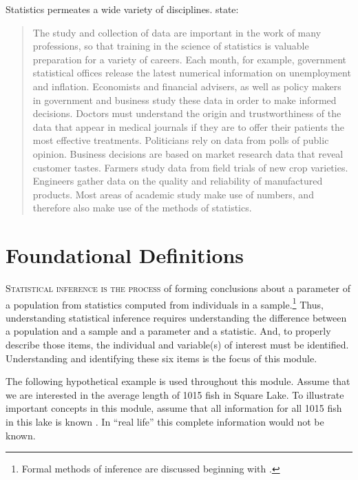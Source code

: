 \documentclass[10pt,openany]{book}\usepackage[]{graphicx}\usepackage[]{color}
\begin{document}
Statistics permeates a wide variety of disciplines. \cite{MooreMcCabe1998} state:
\begin{quote}
The study and collection of data are important in the work of many professions, so that training in the science of statistics is valuable preparation for a variety of careers. Each month, for example, government statistical offices release the latest numerical information on unemployment and inflation. Economists and financial advisers, as well as policy makers in government and business study these data in order to make informed decisions. Doctors must understand the origin and trustworthiness of the data that appear in medical journals if they are to offer their patients the most effective treatments. Politicians rely on data from polls of public opinion. Business decisions are based on market research data that reveal customer tastes. Farmers study data from field trials of new crop varieties. Engineers gather data on the quality and reliability of manufactured products. Most areas of academic study make use of numbers, and therefore also make use of the methods of statistics.
\end{quote}



\chapter{Foundational Definitions} \label{chap:FoundationalDefinitions}

\minitoc
\vspace{18pt}

\lettrine{S}{tatistical inference is the process} of forming conclusions about a parameter of a population from statistics computed from individuals in a sample.\footnote{Formal methods of inference are discussed beginning with .} Thus, understanding statistical inference requires understanding the difference between a population and a sample and a parameter and a statistic. And, to properly describe those items, the individual and variable(s) of interest must be identified. Understanding and identifying these six items is the focus of this module.

The following hypothetical example is used throughout this module. Assume that we are interested in the average length of 1015 fish in Square Lake. To illustrate important concepts in this module, assume that all information for all 1015 fish in this lake is known . In ``real life'' this complete information would not be known.
\end{document}
